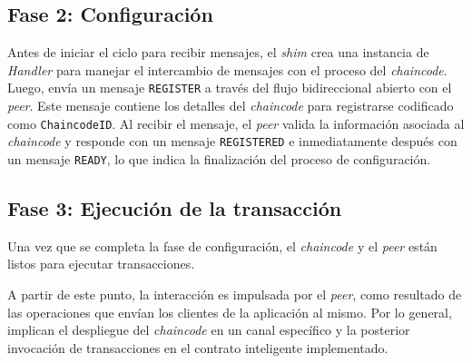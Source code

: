 \subsection{Fase 2: Configuración}
Antes de iniciar el ciclo para recibir mensajes, el \textit{shim} crea una instancia de \textit{Handler} para manejar el intercambio de mensajes con el proceso del \textit{chaincode}. Luego, envía un mensaje \texttt{REGISTER} a través del flujo bidireccional abierto con el \textit{peer}. Este mensaje contiene los detalles del \textit{chaincode} para registrarse codificado como \texttt{ChaincodeID}. Al recibir el mensaje, el \textit{peer} valida la información asociada al \textit{chaincode} y responde con un mensaje \texttt{REGISTERED} e inmediatamente después con un mensaje \texttt{READY}, lo que indica la finalización del proceso de configuración.

\subsection{Fase 3: Ejecución de la transacción}
Una vez que se completa la fase de configuración, el \textit{chaincode} y el \textit{peer} están listos para ejecutar transacciones.

A partir de este punto, la interacción es impulsada por el \textit{peer}, como resultado de las operaciones que envían los clientes de la aplicación al mismo. Por lo general, implican el despliegue del \textit{chaincode} en un canal específico y la posterior invocación de transacciones en el contrato inteligente implementado.

%
%







